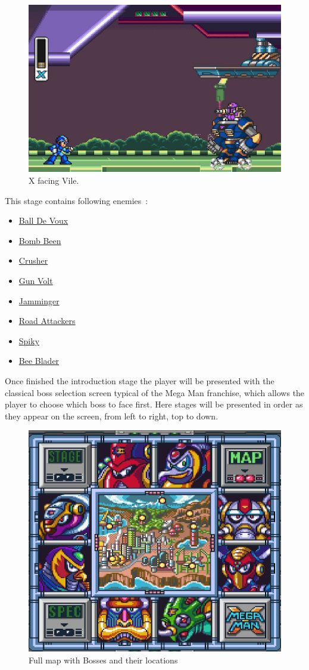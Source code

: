 \begin{figure}[htp]
	\centering
	\includegraphics[width=0.5\linewidth]{figures/X1/Highway_screenshot.jpg}
	\caption{X facing Vile.}
\end{figure}
This stage contains following enemies~\cite{wiki:Highway}:
\begin{itemize}
	\item \hyperlink{enem:Ball_De_Voux}{Ball De Voux}
	\item \hyperlink{enem:Bomb_Been}{Bomb Been}
	\item \hyperlink{enem:Crusher}{Crusher}
	\item \hyperlink{enem:Gun_Volt}{Gun Volt}
	\item \hyperlink{enem:Jamminger}{Jamminger}
	\item \hyperlink{enem:Road_Attackers}{Road Attackers}
	\item \hyperlink{enem:Spiky}{Spiky }
	\item \hyperlink{miniboss:Bee_Blader}{Bee Blader }
\end{itemize}


Once finished the introduction stage the player will be presented with the classical boss selection screen typical of the Mega Man franchise, which allows the player to choose which boss to face first. Here stages will be presented in order as they appear on the screen, from left to right, top to down.

\begin{figure}[htp]
	\centering
	\includegraphics[width=0.5\linewidth]{figures/X1/Full_map.png}
	\caption{Full map with Bosses and their locations}
\end{figure}



